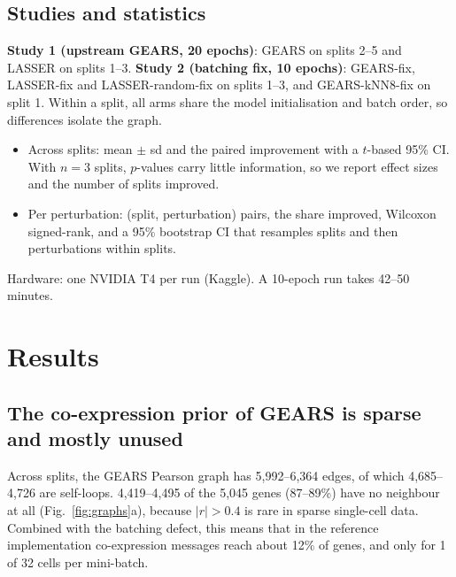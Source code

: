 \documentclass[11pt]{article}
\newcommand{\GEARS}{\textsc{GEARS}}
\newcommand{\LASSER}{\textsc{LASSER}}
\begin{document}
\subsection{Studies and statistics}
\textbf{Study 1 (upstream \GEARS{}, 20 epochs)}: \GEARS{} on splits 2--5 and \LASSER{} on splits 1--3.
\textbf{Study 2 (batching fix, 10 epochs)}: \GEARS-fix, \LASSER-fix and \LASSER-random-fix on splits 1--3, and
\GEARS-kNN8-fix on split 1. Within a split, all arms share the model initialisation and batch order, so
differences isolate the graph.
\begin{itemize}
  \item Across splits: mean $\pm$ sd and the paired improvement with a $t$-based 95\% CI. With $n{=}3$ splits,
        $p$-values carry little information, so we report effect sizes and the number of splits improved.
  \item Per perturbation: (split, perturbation) pairs, the share improved, Wilcoxon signed-rank, and a 95\%
        bootstrap CI that resamples splits and then perturbations within splits.
\end{itemize}
Hardware: one NVIDIA T4 per run (Kaggle). A 10-epoch run takes 42--50 minutes.

\section{Results}

\subsection{The co-expression prior of GEARS is sparse and mostly unused}
Across splits, the \GEARS{} Pearson graph has 5,992--6,364 edges, of which 4,685--4,726 are self-loops.
4,419--4,495 of the 5,045 genes (87--89\%) have no neighbour at all (Fig.~\ref{fig:graphs}a), because
$|r|>0.4$ is rare in sparse single-cell data. Combined with the batching defect, this means that in the reference
implementation co-expression messages reach about 12\% of genes, and only for 1 of 32 cells per mini-batch.
\end{document}
